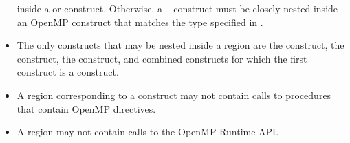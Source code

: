 \begin{itemize}
      inside a  or  construct. Otherwise, a
      ~ construct must be closely nested inside
      an OpenMP construct that matches the type specified in
      .
\item The only constructs that may be nested inside a  region
      are the  construct, the  construct, the
       construct, and combined constructs for which the first
      construct is a  construct.
\item A  region corresponding to a  construct may 
      not contain calls to procedures that contain OpenMP directives. 
\item A  region  may not contain calls to the OpenMP Runtime API.
\end{itemize}
